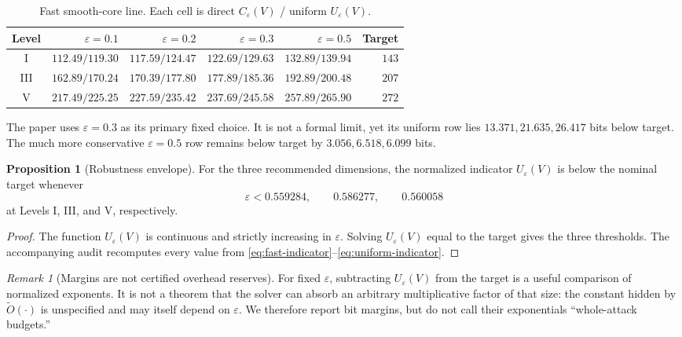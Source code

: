\documentclass[11pt,a4paper]{article}
\theoremstyle{definition}
\newtheorem{proposition}[theorem]{Proposition}
\theoremstyle{remark}
\newtheorem{remark}[theorem]{Remark}
\begin{document}
\begin{table}[t]
\centering
\small
\caption{Fast smooth-core line.  Each cell is direct $C_\varepsilon(V)$ / uniform $U_\varepsilon(V)$.}
\label{tab:eps-sensitivity}
\setlength{\tabcolsep}{4pt}
\begin{tabular}{@{}c r r r r r@{}}
\toprule
Level & $\varepsilon=0.1$ & $\varepsilon=0.2$ & $\varepsilon=0.3$ & $\varepsilon=0.5$ & Target \\
\midrule
I   & $112.49/119.30$ & $117.59/124.47$ & $122.69/129.63$ & $132.89/139.94$ & $143$ \\
III & $162.89/170.24$ & $170.39/177.80$ & $177.89/185.36$ & $192.89/200.48$ & $207$ \\
V   & $217.49/225.25$ & $227.59/235.42$ & $237.69/245.58$ & $257.89/265.90$ & $272$ \\
\bottomrule
\end{tabular}
\end{table}

The paper uses $\varepsilon=0.3$ as its primary fixed choice.  It is not a formal limit, yet its uniform row lies $13.371,21.635,26.417$ bits below target.  The much more conservative $\varepsilon=0.5$ row remains below target by $3.056,6.518,6.099$ bits.

\begin{proposition}[Robustness envelope]\label{prop:eps-robust}
For the three recommended dimensions, the normalized indicator $U_\varepsilon(V)$ is below the nominal target whenever
\[
 \varepsilon<0.559284,\qquad0.586277,\qquad0.560058
\]
at Levels I, III, and V, respectively.
\end{proposition}

\begin{proof}
The function $U_\varepsilon(V)$ is continuous and strictly increasing in $\varepsilon$.  Solving $U_\varepsilon(V)$ equal to the target gives the three thresholds.  The accompanying audit recomputes every value from \eqref{eq:fast-indicator}--\eqref{eq:uniform-indicator}.
\end{proof}

\begin{remark}[Margins are not certified overhead reserves]\label{rem:no-overhead-reserve}
For fixed $\varepsilon$, subtracting $U_\varepsilon(V)$ from the target is a useful comparison of normalized exponents.  It is not a theorem that the solver can absorb an arbitrary multiplicative factor of that size: the constant hidden by $\widetilde O(\cdot)$ is unspecified and may itself depend on $\varepsilon$.  We therefore report bit margins, but do not call their exponentials ``whole-attack budgets.''
\end{remark}
\end{document}
